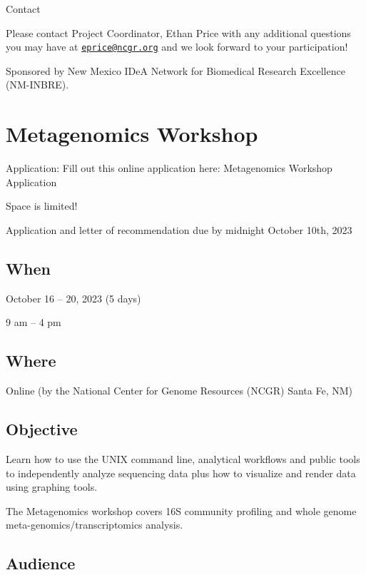 \documentclass[
]{book}
\begin{document}
Contact

Please contact Project Coordinator, Ethan Price with any additional questions you may have at \href{mailto:eprice@ncgr.org}{\nolinkurl{eprice@ncgr.org}} and we look forward to your participation!

Sponsored by New Mexico IDeA Network for Biomedical Research Excellence (NM-INBRE).

\hypertarget{metagenomics-workshop}{%
\chapter{Metagenomics Workshop}\label{metagenomics-workshop}}

Application: Fill out this online application here: Metagenomics Workshop Application

Space is limited!

Application and letter of recommendation due by midnight October 10th, 2023

\hypertarget{when-3}{%
\section{When}\label{when-3}}

October 16 -- 20, 2023 (5 days)

9 am -- 4 pm

\hypertarget{where-3}{%
\section{Where}\label{where-3}}

Online (by the National Center for Genome Resources (NCGR) Santa Fe, NM)

\hypertarget{objective-3}{%
\section{Objective}\label{objective-3}}

Learn how to use the UNIX command line, analytical workflows and public tools to independently analyze sequencing data plus how to visualize and render data using graphing tools.

The Metagenomics workshop covers 16S community profiling and whole genome meta-genomics/transcriptomics analysis.

\hypertarget{audience-3}{%
\section{Audience}\label{audience-3}}
\end{document}
